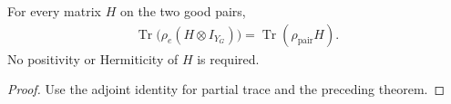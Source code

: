 \begin{theorem}
\label{thm:replica_good_configuration_pair_expectation}
\leanok
For every matrix $H$ on the two good pairs,
\begin{align*}
 \operatorname{Tr}\bigl(\rho_e(H\otimes I_{Y_G})\bigr)
 =\operatorname{Tr}(\rho_{\mathrm{pair}}H).
\end{align*}
No positivity or Hermiticity of $H$ is required.
\end{theorem}
\begin{proof}
\leanok
{}
Use the adjoint identity for partial trace and the preceding theorem.
\end{proof}
